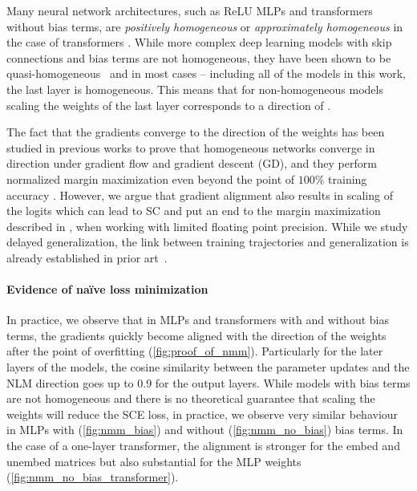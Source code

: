 Many neural network architectures, such as ReLU MLPs and transformers without bias terms, are \emph{positively homogeneous} or \emph{approximately homogeneous} in the case of transformers \citep{homogeneous_transformers}. While more complex deep learning models with skip connections and bias terms are not homogeneous, they have been shown to be quasi-homogeneous~\citep{kunin2023asymmetricmaximummarginbias} and in most cases -- including all of the models in this work, the last layer is homogeneous. This means that for non-homogeneous models scaling the weights of the last layer corresponds to a direction of \nlm. 

The fact that the gradients converge to the direction of the weights has been studied in previous works \citep{NEURIPS2020_c76e4b2f, ji2018gradient, ji20182, Lyu2019-sc} to prove that homogeneous networks converge in direction under gradient flow and gradient descent (GD), and they perform normalized margin maximization even beyond the point of $100\%$ training accuracy \citep{Lyu2019-sc}. However, we argue that gradient alignment also results in scaling of the logits which can lead to SC and put an end to the margin maximization described in \cite{Lyu2019-sc}, when working with limited floating point precision. While we study delayed generalization, the link between training trajectories and generalization is already established in prior art~\citep{birdal2021intrinsic,andreeva2024topological}.

\paragraph{Evidence of naïve loss minimization}
In practice, we observe that in MLPs and transformers with and without bias terms, the gradients quickly become aligned with the direction of the weights after the point of overfitting (\cref{fig:proof_of_nmm}). Particularly for the later layers of the models, the cosine similarity between the parameter updates and the NLM direction goes up to 0.9 for the output layers. While models with bias terms are not homogeneous and there is no theoretical guarantee that scaling the weights will reduce the SCE loss, in practice, we observe very similar behaviour in MLPs with (\cref{fig:nmm_bias}) and without (\cref{fig:nmm_no_bias}) bias terms. In the case of a one-layer transformer, the alignment is stronger for the embed and unembed matrices but also substantial for the MLP weights (\cref{fig:nmm_no_bias_transformer}). 













